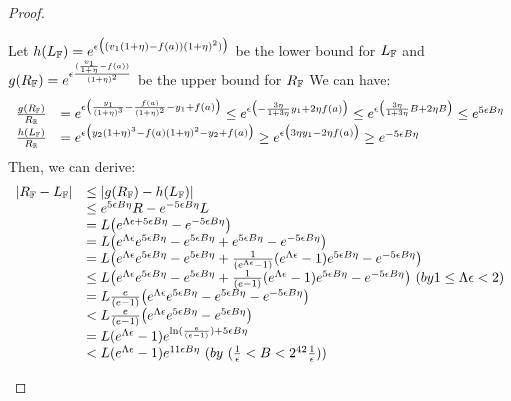 \documentclass[a4paper,11pt]{article}
\begin{document}
\begin{proof}
\begin{itemize}
		Let  $h{(L_{\mathbb{F}}) } = e^{\epsilon 
				\big( (v_1(1 + \eta) - f(a)) (1 + \eta)^2) \big)}$ be the lower bound for $L_{\mathbb{F}}$
		and $g(R_{\mathbb{F}}) = e^{\epsilon 
		\frac{(\frac{v_1}{1 + \eta} - f(a))}{(1 + \eta)^2}}$ be the upper bound for $R_{\mathbb{F}}$
		We can have:
		\[
		\begin{array}{ll}
		\frac{g(\fvalR)}{\rvarR} 
		& = e^{\epsilon
		\big(\frac{y_1}{(1 + \eta)^3} - \frac{f(a)}{(1 + \eta) ^2} 
		- y_1 + f(a) \big)}
		 \leq e^{\epsilon
		\big(- \frac{3 \eta}{1 +3 \eta}y_1 + 2 \eta f(a) \big)}
		 \leq e^{\epsilon
		\big(\frac{3 \eta}{1 +3 \eta}B + 2 \eta B \big)}
		\leq e^{5 \epsilon B \eta}\\
%
		\frac{h(\fvalL )}{\rvarR} 
		& = e^{\epsilon
		\big({y_2}{(1 + \eta)^3} - {f(a)}{(1 + \eta) ^2} 
		- y_2 + f(a) \big)}
		 \geq e^{\epsilon
		\big({3 \eta}y_1 - 2 \eta f(a) \big)}
		\geq e^{-5 \epsilon B \eta}\\
		\end{array}
		\]
		Then, we can derive:
		\[
		\begin{array}{ll}
		|R_{\mathbb{F}} - L_{\mathbb{F}}|
		& \leq |g(R_{\mathbb{F}} ) - h(L_{\mathbb{F}} )| \\
		& \leq e^{5 \epsilon B \eta}R - e^{-5 \epsilon B \eta} L \\
		& = L \big(  e^{ \Lambda\epsilon + 5 \epsilon B \eta} 
		- e^{-5 \epsilon B \eta} \big)\\
		& = L \big( e^{ \Lambda\epsilon} e^{5 \epsilon B \eta}
		-e^{5 \epsilon B \eta}
		+  e^{5 \epsilon B \eta}
		- e^{-5 \epsilon B \eta} \big)\\
		& = L \big( e^{ \Lambda\epsilon} e^{5 \epsilon B \eta}
		- e^{5 \epsilon B \eta}
		+  \frac{1}{(e^{ \Lambda\epsilon} - 1)}
		(e^{ \Lambda\epsilon} - 1)e^{5 \epsilon B \eta}
		- e^{-5 \epsilon B \eta} \big)\\
		& \leq L \big( e^{ \Lambda\epsilon} e^{5 \epsilon B \eta}
		- e^{5 \epsilon B \eta}
		+  \frac{1}{(e - 1)}
		(e^{ \Lambda\epsilon} - 1)e^{5 \epsilon B \eta}
		- e^{-5 \epsilon B \eta} \big) ~( by 1 \leq \Lambda \epsilon < 2)\\ 
		& = L  \frac{e}{(e - 1)} \big( e^{ \Lambda\epsilon} e^{5 \epsilon B \eta}
		- e^{5 \epsilon B \eta}
		- e^{-5 \epsilon B \eta} \big)\\
		& < L  \frac{e}{(e - 1)} \big( e^{ \Lambda\epsilon} e^{5 \epsilon B \eta}
		- e^{5 \epsilon B \eta} \big)\\
		& = L (e^{ \Lambda\epsilon} -  1) e^{\ln(\frac{e}{(e - 1)}) + 5 \epsilon B \eta}\\
		& < L (e^{ \Lambda\epsilon} -  1)e^{11 \epsilon B \eta}~ (by ~ ( \frac{1}{\epsilon} < B < 2^{42} \frac{1}{\epsilon} )) \\

\end{array}\]
\end{itemize}
\end{proof}
\end{document}
